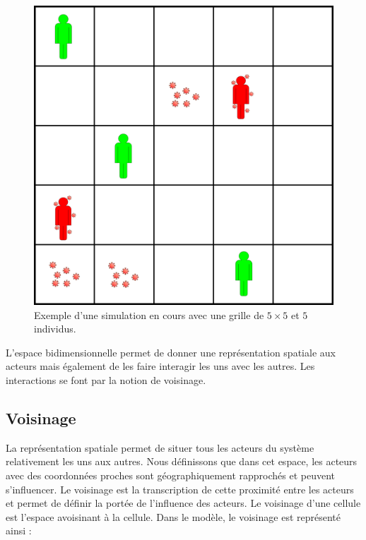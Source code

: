 \begin{figure}[h]
	\centering
	\captionsetup{justification=centering}
	\includegraphics[scale=0.5]{Images/grid.png}
	\caption[Grille régulière]{Exemple d'une simulation en cours avec une grille de $5\times 5$ et $5$ individus.}
\end{figure}

L'espace bidimensionnelle permet de donner une représentation spatiale aux acteurs mais également de les faire interagir les uns avec les autres. Les interactions se font par la notion de voisinage.

\newpage

\subsection{Voisinage}

La représentation spatiale permet de situer tous les acteurs du système relativement les uns aux autres. Nous définissons que dans cet espace, les acteurs avec des coordonnées proches sont géographiquement rapprochés et peuvent s'influencer. Le voisinage est la transcription de cette proximité entre les acteurs et permet de définir la portée de l'influence des acteurs. Le voisinage d'une cellule est l'espace avoisinant à la cellule. Dans le modèle, le voisinage est représenté ainsi :\\

